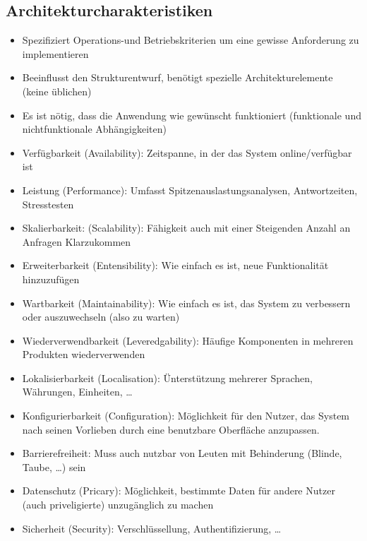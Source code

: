 \documentclass[ngerman,color=3b]{tuda_summary}
\begin{document}
\subsection{Architekturcharakteristiken}
\begin{definition}[Architekturcharakteristik]\begin{itemize}
        \item Spezifiziert Operations-und Betriebskriterien um eine gewisse Anforderung zu implementieren
        \item Beeinflusst den Strukturentwurf, benötigt spezielle Architekturelemente (keine üblichen)
        \item Es ist nötig, dass die Anwendung wie gewünscht funktioniert (funktionale und nichtfunktionale Abhängigkeiten)
    \end{itemize}
\end{definition}
\begin{itemize}
    \item Verfügbarkeit (Availability): Zeitspanne, in der das System online/verfügbar ist
    \item Leistung (Performance): Umfasst Spitzenauslastungsanalysen, Antwortzeiten, Stresstesten
    \item Skalierbarkeit: (Scalability): Fähigkeit auch mit einer Steigenden Anzahl an Anfragen Klarzukommen
\end{itemize}
\begin{itemize}
    \item Erweiterbarkeit (Entensibility): Wie einfach es ist, neue Funktionalität hinzuzufügen
    \item Wartbarkeit (Maintainability): Wie einfach es ist, das System zu verbessern oder auszuwechseln (also zu warten)
    \item Wiederverwendbarkeit (Leveredgability): Häufige Komponenten in mehreren Produkten wiederverwenden
    \item Lokalisierbarkeit (Localisation): Ünterstützung mehrerer Sprachen, Währungen, Einheiten, \dots
    \item Konfigurierbarkeit (Configuration): Möglichkeit für den Nutzer, das System nach seinen Vorlieben durch eine benutzbare Oberfläche anzupassen.
\end{itemize}
\begin{itemize}
    \item Barrierefreiheit: Muss auch nutzbar von Leuten mit Behinderung (Blinde, Taube, \dots) sein
    \item Datenschutz (Pricary): Möglichkeit, bestimmte Daten für andere Nutzer (auch priveligierte) unzugänglich zu machen
    \item Sicherheit (Security): Verschlüssellung, Authentifizierung, \dots
\end{itemize}
\end{document}
